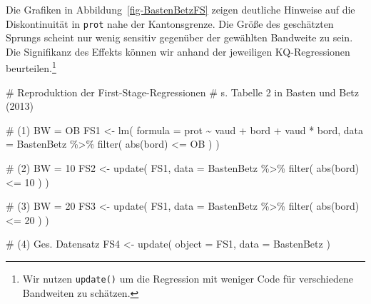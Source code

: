 \documentclass[
  a4paper,
  DIV=11,
  oneside]{scrreprt}
\newenvironment{Shaded}{\begin{snugshade}}{\end{snugshade}}
\newcommand{\AttributeTok}[1]{\textcolor[rgb]{0.40,0.45,0.13}{#1}}
\newcommand{\CommentTok}[1]{\textcolor[rgb]{0.37,0.37,0.37}{#1}}
\newcommand{\DecValTok}[1]{\textcolor[rgb]{0.68,0.00,0.00}{#1}}
\newcommand{\FunctionTok}[1]{\textcolor[rgb]{0.28,0.35,0.67}{#1}}
\newcommand{\NormalTok}[1]{\textcolor[rgb]{0.00,0.23,0.31}{#1}}
\newcommand{\OtherTok}[1]{\textcolor[rgb]{0.00,0.23,0.31}{#1}}
\newcommand{\SpecialCharTok}[1]{\textcolor[rgb]{0.37,0.37,0.37}{#1}}
\begin{document}
Die Grafiken in Abbildung~\ref{fig-BastenBetzFS} zeigen deutliche
Hinweise auf die Diskontinuität in \texttt{prot} nahe der Kantonsgrenze.
Die Größe des geschätzten Sprungs scheint nur wenig sensitiv gegenüber
der gewählten Bandweite zu sein. Die Signifikanz des Effekts können wir
anhand der jeweiligen KQ-Regressionen beurteilen.\footnote{Wir nutzen
  \texttt{update()} um die Regression mit weniger Code für verschiedene
  Bandweiten zu schätzen.}

\begin{Shaded}
\begin{Highlighting}[]
\CommentTok{\# Reproduktion der First{-}Stage{-}Regressionen}
\CommentTok{\# s. Tabelle 2 in Basten und Betz (2013)}

\CommentTok{\# (1) BW = OB}
\NormalTok{FS1 }\OtherTok{\textless{}{-}} \FunctionTok{lm}\NormalTok{(}
  \AttributeTok{formula =}\NormalTok{ prot }\SpecialCharTok{\textasciitilde{}}\NormalTok{ vaud }\SpecialCharTok{+}\NormalTok{ bord }\SpecialCharTok{+}\NormalTok{ vaud }\SpecialCharTok{*}\NormalTok{ bord, }
  \AttributeTok{data =}\NormalTok{ BastenBetz }\SpecialCharTok{\%\textgreater{}\%} 
    \FunctionTok{filter}\NormalTok{(}
      \FunctionTok{abs}\NormalTok{(bord) }\SpecialCharTok{\textless{}=}\NormalTok{ OB}
\NormalTok{    )}
\NormalTok{)}

\CommentTok{\# (2) BW = 10}
\NormalTok{FS2 }\OtherTok{\textless{}{-}} \FunctionTok{update}\NormalTok{(}
\NormalTok{  FS1,}
  \AttributeTok{data =}\NormalTok{ BastenBetz }\SpecialCharTok{\%\textgreater{}\%} 
    \FunctionTok{filter}\NormalTok{(}
      \FunctionTok{abs}\NormalTok{(bord) }\SpecialCharTok{\textless{}=} \DecValTok{10}
\NormalTok{    )}
\NormalTok{)}

\CommentTok{\# (3) BW = 20}
\NormalTok{FS3 }\OtherTok{\textless{}{-}} \FunctionTok{update}\NormalTok{(}
\NormalTok{  FS1,}
  \AttributeTok{data =}\NormalTok{ BastenBetz }\SpecialCharTok{\%\textgreater{}\%}
    \FunctionTok{filter}\NormalTok{(}
      \FunctionTok{abs}\NormalTok{(bord) }\SpecialCharTok{\textless{}=} \DecValTok{20}
\NormalTok{    )}
\NormalTok{)}

\CommentTok{\# (4) Ges. Datensatz}
\NormalTok{FS4 }\OtherTok{\textless{}{-}} \FunctionTok{update}\NormalTok{(}
  \AttributeTok{object =}\NormalTok{ FS1,}
  \AttributeTok{data =}\NormalTok{ BastenBetz}
\NormalTok{)}
\end{Highlighting}
\end{Shaded}
\end{document}
